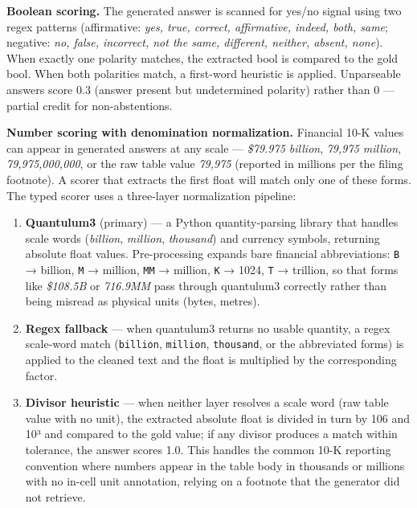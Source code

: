 \textbf{Boolean scoring.} The generated answer is scanned for yes/no signal using two regex patterns (affirmative: \emph{yes, true, correct, affirmative, indeed, both, same}; negative: \emph{no, false, incorrect, not the same, different, neither, absent, none}). When exactly one polarity matches, the extracted bool is compared to the gold bool. When both polarities match, a first-word heuristic is applied. Unparseable answers score 0.3 (answer present but undetermined polarity) rather than 0 --- partial credit for non-abstentions.

\textbf{Number scoring with denomination normalization.} Financial 10-K values can appear in generated answers at any scale --- \emph{\$79.975 billion}, \emph{79,975 million}, \emph{79,975,000,000}, or the raw table value \emph{79,975} (reported in millions per the filing footnote). A scorer that extracts the first float will match only one of these forms. The typed scorer uses a three-layer normalization pipeline:

\begin{enumerate}
\def\labelenumi{\arabic{enumi}.}
\item
  \textbf{Quantulum3} (primary) --- a Python quantity-parsing library that handles scale words (\emph{billion}, \emph{million}, \emph{thousand}) and currency symbols, returning absolute float values. Pre-processing expands bare financial abbreviations: \texttt{B} → billion, \texttt{M} → million, \texttt{MM} → million, \texttt{K} → 1024, \texttt{T} → trillion, so that forms like \emph{\$108.5B} or \emph{716.9MM} pass through quantulum3 correctly rather than being misread as physical units (bytes, metres).
\item
  \textbf{Regex fallback} --- when quantulum3 returns no usable quantity, a regex scale-word match (\texttt{billion}, \texttt{million}, \texttt{thousand}, or the abbreviated forms) is applied to the cleaned text and the float is multiplied by the corresponding factor.
\item
  \textbf{Divisor heuristic} --- when neither layer resolves a scale word (raw table value with no unit), the extracted absolute float is divided in turn by 106 and 10³ and compared to the gold value; if any divisor produces a match within tolerance, the answer scores 1.0. This handles the common 10-K reporting convention where numbers appear in the table body in thousands or millions with no in-cell unit annotation, relying on a footnote that the generator did not retrieve.
\end{enumerate}

